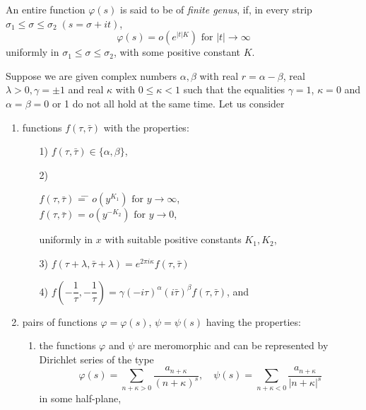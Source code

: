 An entire function $\varphi(s)$ is said to be of \textit{finite
  genus}, if, in every strip $\sigma_1\leq \sigma \leq
\sigma_2 \; (s=\sigma+ it)$,
$$
\varphi(s) = o (e^{|t|K}) \text{ for } |t| \to \infty
$$
uniformly in $\sigma_1 \leq \sigma \leq \sigma_2$, with some positive
constant $K$.

\setcounter{thm}{34}
\begin{thm}\label{chap5:thm35}
Suppose we are given complex numbers $\alpha,\beta$ with real
$r=\alpha-\beta$, real $\lambda>0,\gamma=\pm 1$ and real $\kappa$ with
$0\leq \kappa < 1$ such that the equalities $\gamma=1$, $\kappa=0$ and
$\alpha=\beta=0$ or 1 do not all hold at the same time. Let us
consider 
\begin{enumerate}
\renewcommand{\theenumi}{\Roman{enumi}}
\renewcommand{\labelenumi}{\theenumi)}
\item functions $f(\tau,\bar{\tau})$ with the properties:
\begin{itemize}
\item[1)] $f(\tau,\bar{\tau}) \in \{\alpha,\beta\}$,

\item[2)]
\begin{tabbing}
$f(\tau,\bar{\tau})$ \= = \= $o (y^{K_1}) \text{ for } y \to \infty$,\\
$f(\tau,\bar{\tau})$ \> = \> $o(y^{-K_2}) \text{ for } y \to 0$,
\end{tabbing}
uniformly in $x$ with suitable positive constants $K_1,K_2$,

\item[3)] $f(\tau+\lambda,\bar{\tau}+\lambda) =e^{2\pi i
  \kappa}f(\tau,\bar{\tau})$\pageoriginale

\item[4)] $f(-\dfrac{1}{\tau}, - \dfrac{1}{\tau}) =
  \gamma(-i\tau)^{\alpha} (i\bar{\tau})^{\beta} f(\tau,\bar{\tau})$,
  and 
\end{itemize}

\item pairs of functions $\varphi=\varphi(s)$, $\psi=\psi(s)$ having
  the properties:
\begin{enumerate}
\renewcommand{\theenumii}{\arabic{enumii}}
\renewcommand{\labelenumii}{\theenumii)}
\item the functions $\varphi$ and $\psi$ are meromorphic and can be
  represented by Dirichlet series of the type
$$
\varphi(s) = \sum_{n+\kappa>0} \frac{a_{n+\kappa}}{(n+\kappa)^s},
\quad \psi(s) = \sum_{n+\kappa<0} \frac{a_{n+\kappa}}{|n+\kappa|^s}
$$
in some half-plane,


\end{enumerate}
\end{enumerate}
\end{thm}
